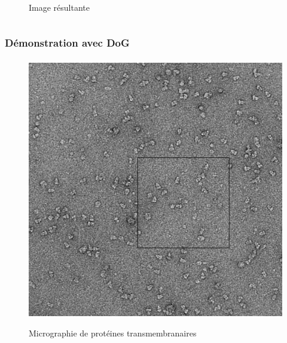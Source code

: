 \documentclass[11pt]{beamer}
\begin{document}
\begin{frame}
\begin{columns}
\begin{column}{5cm}
\begin{figure}
				Image résultante
			\end{figure}
		\end{column}
	\end{columns}
\end{frame}

\subsubsection*{Démonstration avec DoG}

\begin{frame}
\frametitle{\subsubsecname}%
			\begin{figure}
				\includegraphics[scale=0.09]{base.png}
	
				Micrographie de protéines transmembranaires
			\end{figure}
\end{frame}
\end{document}
